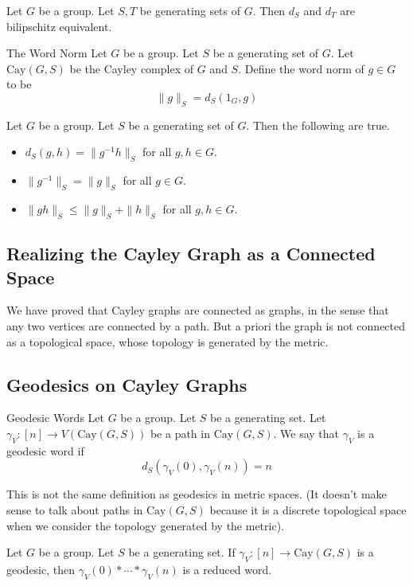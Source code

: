 \documentclass[a4paper]{article}
\begin{document}
\begin{lmm}{}{} Let $G$ be a group. Let $S,T$ be generating sets of $G$. Then $d_S$ and $d_T$ are bilipschitz equivalent. 
\end{lmm}

\begin{defn}{The Word Norm}{} Let $G$ be a group. Let $S$ be a generating set of $G$. Let $\text{Cay}(G,S)$ be the Cayley complex of $G$ and $S$. Define the word norm of $g\in G$ to be $$\|g\|_S=d_S(1_G,g)$$
\end{defn}

\begin{lmm}{}{} Let $G$ be a group. Let $S$ be a generating set of $G$. Then the following are true. 
\begin{itemize}
\item $d_S(g,h)=\|g^{-1}h\|_S$ for all $g,h\in G$. 
\item $\|g^{-1}\|_S=\|g\|_S$ for all $g\in G$. 
\item $\|gh\|_S\leq\|g\|_S+\|h\|_S$ for all $g,h\in G$. 
\end{itemize}
\end{lmm}

\subsection{Realizing the Cayley Graph as a Connected Space}
We have proved that Cayley graphs are connected as graphs, in the sense that any two vertices are connected by a path. But a priori the graph is not connected as a topological space, whose topology is generated by the metric. 

\subsection{Geodesics on Cayley Graphs}
\begin{defn}{Geodesic Words}{} Let $G$ be a group. Let $S$ be a generating set. Let $\gamma_V:[n]\to V(\text{Cay}(G,S))$ be a path in $\text{Cay}(G,S)$. We say that $\gamma_V$ is a geodesic word if $$d_S(\gamma_V(0),\gamma_V(n))=n$$
\end{defn}

This is not the same definition as geodesics in metric spaces. (It doesn't make sense to talk about paths in $\text{Cay}(G,S)$ because it is a discrete topological space when we consider the topology generated by the metric). 

\begin{lmm}{}{} Let $G$ be a group. Let $S$ be a generating set. If $\gamma_V:[n]\to\text{Cay}(G,S)$ is a geodesic, then $\gamma_V(0)\ast\cdots\ast\gamma_V(n)$ is a reduced word. 
\end{lmm}
\end{document}

